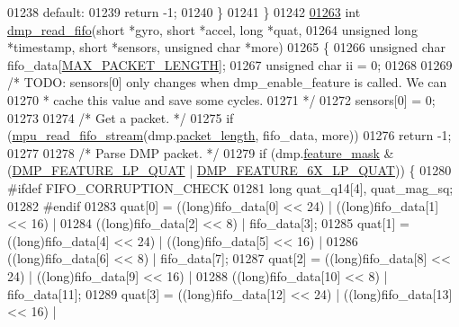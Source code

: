 \begin{DoxyCode}
01238     \textcolor{keywordflow}{default}:
01239         \textcolor{keywordflow}{return} -1;
01240     \}
01241 \}
01242 
\hypertarget{inv__mpu__dmp__motion__driver_8c_source.tex_l01263}{}\hyperlink{group___d_r_i_v_e_r_s_ga02db5f25359abe84be002c543cdc3803}{01263} \textcolor{keywordtype}{int} \hyperlink{group___d_r_i_v_e_r_s_ga02db5f25359abe84be002c543cdc3803}{dmp\_read\_fifo}(\textcolor{keywordtype}{short} *gyro, \textcolor{keywordtype}{short} *accel, \textcolor{keywordtype}{long} *quat,
01264     \textcolor{keywordtype}{unsigned} \textcolor{keywordtype}{long} *timestamp, \textcolor{keywordtype}{short} *sensors, \textcolor{keywordtype}{unsigned} \textcolor{keywordtype}{char} *more)
01265 \{
01266     \textcolor{keywordtype}{unsigned} \textcolor{keywordtype}{char} fifo\_data[\hyperlink{group___d_r_i_v_e_r_s_ga973c680573b37fc359fc68d0707da355}{MAX\_PACKET\_LENGTH}];
01267     \textcolor{keywordtype}{unsigned} \textcolor{keywordtype}{char} ii = 0;
01268 
01269     \textcolor{comment}{/* TODO: sensors[0] only changes when dmp\_enable\_feature is called. We can}
01270 \textcolor{comment}{     * cache this value and save some cycles.}
01271 \textcolor{comment}{     */}
01272     sensors[0] = 0;
01273 
01274     \textcolor{comment}{/* Get a packet. */}
01275     \textcolor{keywordflow}{if} (\hyperlink{group___d_r_i_v_e_r_s_ga13593044949b460e9f571eb57e9a0788}{mpu\_read\_fifo\_stream}(dmp.\hyperlink{structdmp__s_a6423143ff761c75d97f34c8465393ea0}{packet\_length}, fifo\_data, more))
01276         \textcolor{keywordflow}{return} -1;
01277 
01278     \textcolor{comment}{/* Parse DMP packet. */}
01279     \textcolor{keywordflow}{if} (dmp.\hyperlink{structdmp__s_ac1c048fa56b613b3223d2e66ac2c050f}{feature\_mask} & (\hyperlink{group___d_r_i_v_e_r_s_gabf442c0477f8f7704a8094519ddfe38e}{DMP\_FEATURE\_LP\_QUAT} | 
      \hyperlink{group___d_r_i_v_e_r_s_gae879a3c9729f9e1be5e6d7c9211c69c0}{DMP\_FEATURE\_6X\_LP\_QUAT})) \{
01280 \textcolor{preprocessor}{#ifdef FIFO\_CORRUPTION\_CHECK}
01281         \textcolor{keywordtype}{long} quat\_q14[4], quat\_mag\_sq;
01282 \textcolor{preprocessor}{#endif}
01283         quat[0] = ((long)fifo\_data[0] << 24) | ((long)fifo\_data[1] << 16) |
01284             ((long)fifo\_data[2] << 8) | fifo\_data[3];
01285         quat[1] = ((long)fifo\_data[4] << 24) | ((long)fifo\_data[5] << 16) |
01286             ((long)fifo\_data[6] << 8) | fifo\_data[7];
01287         quat[2] = ((long)fifo\_data[8] << 24) | ((long)fifo\_data[9] << 16) |
01288             ((long)fifo\_data[10] << 8) | fifo\_data[11];
01289         quat[3] = ((long)fifo\_data[12] << 24) | ((long)fifo\_data[13] << 16) |

\end{DoxyCode}
